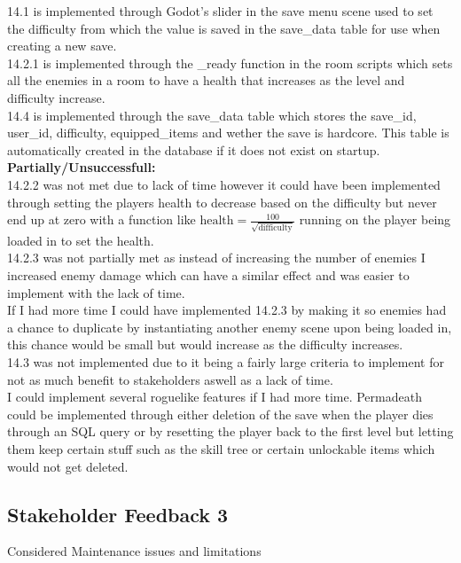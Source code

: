 \documentclass{article}
\begin{document}
        14.1 is implemented through Godot's slider in the save menu scene used to set the difficulty from which the value is saved in the save\_data table for use when creating a new save.\\
        14.2.1 is implemented through the \_ready function in the room scripts which sets all the enemies in a room to have a health that increases as the level and difficulty increase.\\
        14.4 is implemented through the save\_data table which stores the save\_id, user\_id, difficulty, equipped\_items and wether the save is hardcore. This table is automatically created in the database if it does not exist on startup.\\
        \textbf{Partially/Unsuccessfull:}\\
        14.2.2 was not met due to lack of time however it could have been implemented through setting the players health to decrease based on the difficulty but never end up at zero with a function like $\text{health} = \frac{100}{\sqrt{\text{difficulty}}}$ running on the player being loaded in to set the health.\\
        14.2.3 was not partially met as instead of increasing the number of enemies I increased enemy damage which can have a similar effect and was easier to implement with the lack of time.\\
        If I had more time I could have implemented 14.2.3 by making it so enemies had a chance to duplicate by instantiating another enemy scene upon being loaded in, this chance would be small but would increase as the difficulty increases.\\
        14.3 was not implemented due to it being a fairly large criteria to implement for not as much benefit to stakeholders aswell as a lack of time.\\
        I could implement several roguelike features if I had more time. Permadeath could be implemented through either deletion of the save when the player dies through an SQL query or by resetting the player back to the first level but letting them keep certain stuff such as the skill tree or certain unlockable items which would not get deleted.\\
        \subsection{Stakeholder Feedback 3}
        Considered Maintenance issues and limitations
\end{document}
